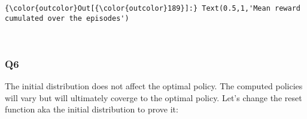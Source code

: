 \documentclass[11pt]{article}
\begin{document}
\begin{Verbatim}[commandchars=\\\{\}]
{\color{outcolor}Out[{\color{outcolor}189}]:} Text(0.5,1,'Mean reward cumulated over the episodes')
\end{Verbatim}
            
    \begin{center}
    \end{center}
    { \hspace*{\fill} \\}
    
    \subsubsection{Q6}\label{q6}

    The initial distribution does not affect the optimal policy. The
computed policies will vary but will ultimately coverge to the optimal
policy. Let's change the reset function aka the initial distribution to
prove it:
\end{document}
